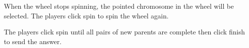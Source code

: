 \documentclass[12pt,oneside,openright,a4paper]{cpe-english-project}
\begin{document}
\begin{itemize}
\begin{enumerate}
		When the wheel stops spinning, the pointed chromosome in the wheel will be selected. The players click spin to spin the wheel again. \\
		\begin{minipage}[c]{\textwidth}\centering {}  \end{minipage}
		The players click spin until all pairs of new parents are complete then click finish to send the answer. \\


\end{enumerate}
\end{itemize}
\end{document}
